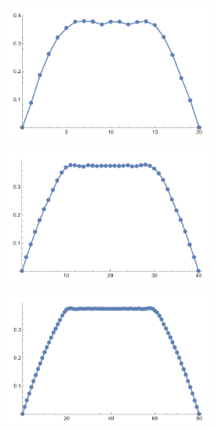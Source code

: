 \documentclass[12pt, a4paper]{article}
\begin{document}
	\begin{figure}[H]
		\centering
		\begin{subfigure}{.5\textwidth}
			\centering
			\includegraphics[width=0.75\textwidth]{test2-01}
		\end{subfigure}%
		\begin{subfigure}{.5\textwidth}
			\centering
			\includegraphics[width=0.75\textwidth]{test2-05}
		\end{subfigure}
		\begin{subfigure}{.5\textwidth}
			\centering
			\includegraphics[width=0.75\textwidth]{test2-075}
		\end{subfigure}%
		\begin{subfigure}{.5\textwidth}

\end{subfigure}
\end{figure}
\end{document}
